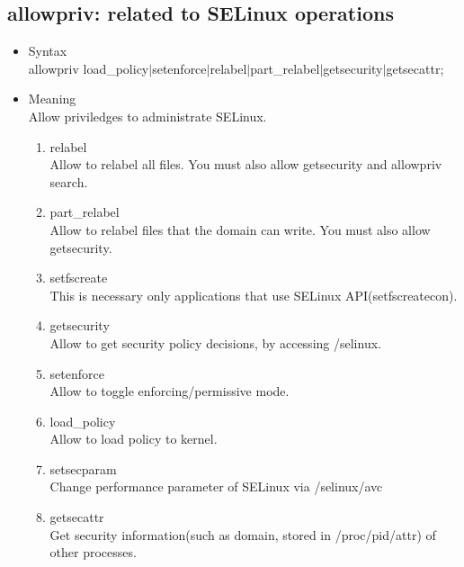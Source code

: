 \documentclass{article}
\begin{document}
\subsection{allowpriv: related to SELinux operations}
\begin{itemize}
 \item Syntax\\
       allowpriv load\_policy$\mid$setenforce$\mid$relabel$\mid$part\_relabel$\mid$getsecurity$\mid$getsecattr;
 \item Meaning\\
       Allow priviledges to administrate SELinux.
       \begin{enumerate}
	\item relabel\\
	      Allow to relabel all files. You must also allow
	      getsecurity and allowpriv search.
	\item part\_relabel\\
	      Allow to relabel files that the domain can write. You must
	      also allow getsecurity. 
	\item setfscreate\\
	      This is necessary only applications that use SELinux API(setfscreatecon).
	\item getsecurity\\
	      Allow to get security policy decisions, by accessing /selinux.
	\item setenforce\\        
	      Allow to toggle enforcing/permissive mode.
	\item load\_policy\\                    
	      Allow to load policy to kernel.
	\item setsecparam\\
	      Change performance parameter of SELinux via /selinux/avc
	\item getsecattr\\
	      Get security information(such as domain, stored in /proc/pid/attr) of other processes.
       \end{enumerate}
\end{itemize}
\end{document}
